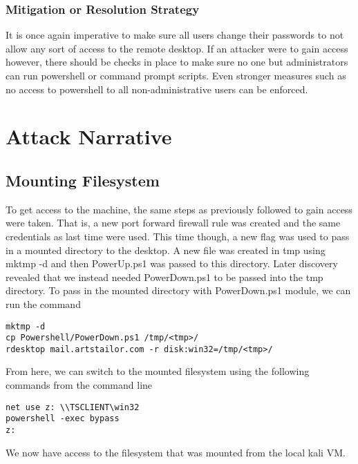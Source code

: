 \documentclass[notitlepage]{article}
\begin{document}
    \subsubsection*{Mitigation or Resolution Strategy}
    It is once again imperative to make sure all users change their passwords to not allow any sort 
    of access to the remote desktop. If an attacker were to gain access however, there should be checks
    in place to make sure no one but administrators can run powershell or command prompt scripts. Even
    stronger measures such as no access to powershell to all non-administrative users can be enforced.



\section{Attack Narrative}

    \subsection{Mounting Filesystem}
    To get access to the machine, the same steps as previously followed to gain access were taken. That is, a new port forward firewall rule was created and the
    same credentials as last time were used. This time though, a new flag was used to pass in a mounted directory to the desktop. A new file was created in tmp
    using mktmp -d and then PowerUp.ps1 was passed to this directory. Later discovery revealed that we instead needed PowerDown.ps1 to be passed into the tmp directory.
    To pass in the mounted directory with PowerDown.ps1 module, we can run the command
    \begin{verbatim}
mktmp -d
cp Powershell/PowerDown.ps1 /tmp/<tmp>/
rdesktop mail.artstailor.com -r disk:win32=/tmp/<tmp>/
    \end{verbatim}
    From here, we can switch to the mounted filesystem using the following commands from the command line
    \begin{verbatim}
net use z: \\TSCLIENT\win32
powershell -exec bypass
z:
    \end{verbatim}
    We now have access to the filesystem that was mounted from the local kali VM.
\end{document}
